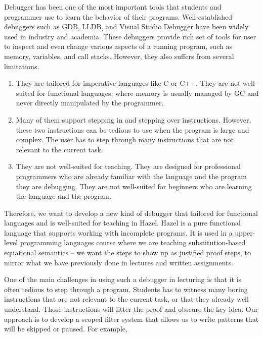 Debugger has been one of the most important tools that students and programmer
use to learn the behavior of their programs. Well-established debuggers such as
GDB, LLDB, and Visual Studio Debugger have been widely used in industry and
academia. These debuggers provide rich set of tools for user to inspect and even
change various aspects of a running program, such as memory, variables,
and call stacks. However, they also suffers from several limitations.

\begin{enumerate}
  \item They are tailored for imperative languages like C or C++. They are not
    well-suited for functional languages, where memory is usually managed by
    GC and never directly manipulated by the programmer.
  \item Many of them support stepping in and stepping over instructions. However,
    these two instructions can be tedious to use when the program is large and
    complex. The user has to step through many instructions that are not relevant
    to the current task.
  \item They are not well-suited for teaching. They are designed for professional
    programmers who are already familiar with the language and the program they
    are debugging. They are not well-suited for beginners who are learning the
    language and the program.
\end{enumerate}

Therefore, we want to develop a new kind of debugger that tailored for
functional languages and is well-suited for teaching in Hazel. Hazel is a pure
functional language that supports working with incomplete programs. It is used
in a upper-level programming languages course where we are teaching
substitution-based equational semantics -- we want the steps to show up as
justified proof steps, to mirror what we have previously done in lectures and
written assignments.


One of the main challenges in using such a debugger in lecturing is that it is
often tedious to step through a program. Students has to witness many boring
instructions that are not relevant to the current task, or that they already
well understand. Those instructions will litter the proof and obscure the key
idea. Our approach is to develop a scoped filter system that allows us to write patterns
that will be skipped or paused. For example,

